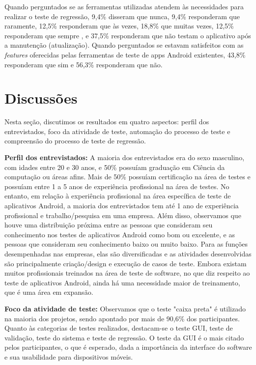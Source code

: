 \begin{enumerate}[label=\bf QP\arabic*]
Quando perguntados se as ferramentas utilizadas atendem às necessidades para realizar o teste de regressão, 9,4\% disseram que nunca, 9,4\% responderam que raramente, 12,5\% responderam que às vezes, 18,8\% que muitas vezes, 12,5\% responderam que sempre , e 37,5\% responderam que não testam o aplicativo após a manutenção (atualização). Quando perguntados se estavam satisfeitos com as \textit{features} oferecidas pelas ferramentas de teste de apps Android existentes, 43,8\% responderam que sim e 56,3\% responderam que não.

\end{enumerate}

\section{Discussões}\label{discussions}

Nesta seção, discutimos os resultados em quatro aspectos: perfil dos entrevistados, foco da atividade de teste, automação do processo de teste e compreensão do processo de teste de regressão.

\textbf{Perfil dos entrevistados:} A maioria dos entrevistados era do sexo masculino, com idades entre 20 e 30 anos, e 50\% possuíam graduação em Ciência da computação ou áreas afins. Mais de 50\% possuíam certificação na área de testes e possuíam entre 1 a 5 anos de experiência profissional na área de testes. No entanto, em relação à experiência profissional na área específica de teste de aplicativos Android, a maioria dos entrevistados tem até 1 ano de experiência profissional e trabalho/pesquisa em uma empresa. Além disso, observamos que houve uma distribuição próxima entre as pessoas que consideram seu conhecimento nos testes de aplicativos Android como bom ou excelente, e as pessoas que consideram seu conhecimento baixo ou muito baixo. Para as funções desempenhadas nas empresas, elas são diversificadas e as atividades desenvolvidas são principalmente criação/design e execução de casos de teste. Embora existam muitos profissionais treinados na área de teste de software, no que diz respeito ao teste de aplicativos Android, ainda há uma necessidade maior de treinamento, que é uma área em expansão.
    
\textbf{Foco da atividade de teste:} Observamos que o teste "caixa preta" é utilizado na maioria dos projetos, sendo apontado por mais de 90,6\% dos participantes. Quanto às categorias de testes realizados, destacam-se o teste \ac{GUI}, teste de validação, teste do sistema e teste de regressão. O teste da GUI é o mais citado pelos participantes, o que é esperado, dada a importância da interface do software e sua usabilidade para dispositivos móveis.
    
